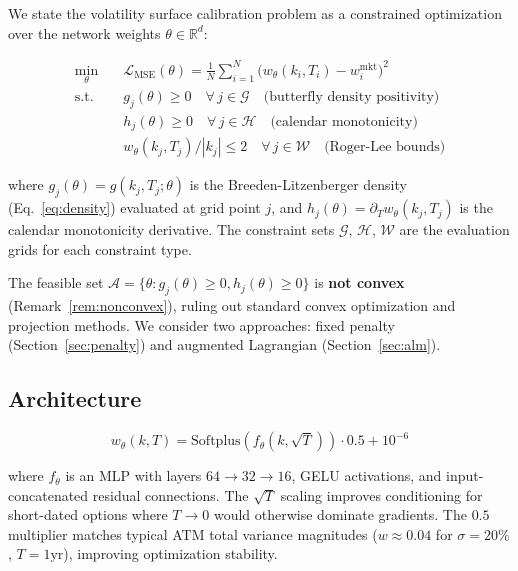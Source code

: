 \documentclass[11pt,a4paper]{article}
\newcommand{\R}{\mathbb{R}}
\newcommand{\loss}{\mathcal{L}}
\newcommand{\density}{g}
\begin{document}
We state the volatility surface calibration problem as a constrained optimization over the network weights $\theta \in \R^d$:

\begin{equation}
\label{eq:constrained_problem}
\begin{aligned}
    \min_{\theta} \quad & \loss_{\text{MSE}}(\theta) = \frac{1}{N} \sum_{i=1}^{N} \bigl( w_\theta(k_i, T_i) - w_i^{\text{mkt}} \bigr)^2 \\
    \text{s.t.} \quad & g_j(\theta) \geq 0 \quad \forall\, j \in \mathcal{G} \quad \text{(butterfly density positivity)} \\
    & h_j(\theta) \geq 0 \quad \forall\, j \in \mathcal{H} \quad \text{(calendar monotonicity)} \\
    & w_\theta(k_j, T_j) / |k_j| \leq 2 \quad \forall\, j \in \mathcal{W} \quad \text{(Roger-Lee bounds)}
\end{aligned}
\end{equation}

where $g_j(\theta) = \density(k_j, T_j; \theta)$ is the Breeden-Litzenberger density (Eq.~\eqref{eq:density}) evaluated at grid point $j$, and $h_j(\theta) = \partial_T w_\theta(k_j, T_j)$ is the calendar monotonicity derivative. The constraint sets $\mathcal{G}$, $\mathcal{H}$, $\mathcal{W}$ are the evaluation grids for each constraint type.

The feasible set $\mathcal{A} = \{\theta : g_j(\theta) \geq 0, h_j(\theta) \geq 0\}$ is \textbf{not convex} (Remark~\ref{rem:nonconvex}), ruling out standard convex optimization and projection methods. We consider two approaches: fixed penalty (Section~\ref{sec:penalty}) and augmented Lagrangian (Section~\ref{sec:alm}).

\subsection{Architecture}

\begin{equation}
    w_\theta(k, T) = \text{Softplus}\left( f_\theta(k, \sqrt{T}) \right) \cdot 0.5 + 10^{-6}
\end{equation}

where $f_\theta$ is an MLP with layers $64 \to 32 \to 16$, GELU activations, and input-concatenated residual connections. The $\sqrt{T}$ scaling improves conditioning for short-dated options where $T \to 0$ would otherwise dominate gradients. The $0.5$ multiplier matches typical ATM total variance magnitudes ($w \approx 0.04$ for $\sigma = 20\%$, $T = 1\text{yr}$), improving optimization stability.
\end{document}
